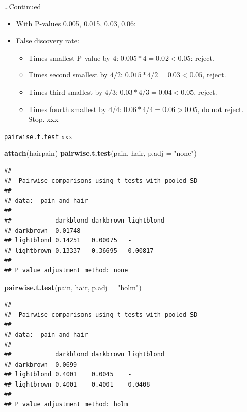 \documentclass[ignorenonframetext,]{beamer}
\newenvironment{Shaded}{\begin{snugshade}}{\end{snugshade}}
\newcommand{\DataTypeTok}[1]{\textcolor[rgb]{0.13,0.29,0.53}{#1}}
\newcommand{\KeywordTok}[1]{\textcolor[rgb]{0.13,0.29,0.53}{\textbf{#1}}}
\newcommand{\NormalTok}[1]{#1}
\newcommand{\StringTok}[1]{\textcolor[rgb]{0.31,0.60,0.02}{#1}}
\begin{document}
\begin{frame}{\ldots Continued}
\protect\hypertarget{continued}{}

\begin{itemize}
\item
  With P-values 0.005, 0.015, 0.03, 0.06:
\item
  False discovery rate:

  \begin{itemize}
  \item
    Times smallest P-value by 4: \(0.005*4=0.02<0.05\): reject.
  \item
    Times second smallest by \(4/2\): \(0.015*4/2=0.03<0.05\), reject.
  \item
    Times third smallest by \(4/3\): \(0.03*4/3=0.04<0.05\), reject.
  \item
    Times fourth smallest by \(4/4\): \(0.06*4/4=0.06>0.05\), do not
    reject. Stop. xxx
  \end{itemize}
\end{itemize}

\end{frame}

\begin{frame}[fragile]{\texttt{pairwise.t.test} xxx}
\protect\hypertarget{pairwise.t.test-xxx}{}

\tiny

\begin{Shaded}
\begin{Highlighting}[]
\KeywordTok{attach}\NormalTok{(hairpain)}
\KeywordTok{pairwise.t.test}\NormalTok{(pain, hair, }\DataTypeTok{p.adj =} \StringTok{"none"}\NormalTok{)}
\end{Highlighting}
\end{Shaded}

\begin{verbatim}
## 
##  Pairwise comparisons using t tests with pooled SD 
## 
## data:  pain and hair 
## 
##            darkblond darkbrown lightblond
## darkbrown  0.01748   -         -         
## lightblond 0.14251   0.00075   -         
## lightbrown 0.13337   0.36695   0.00817   
## 
## P value adjustment method: none
\end{verbatim}

\begin{Shaded}
\begin{Highlighting}[]
\KeywordTok{pairwise.t.test}\NormalTok{(pain, hair, }\DataTypeTok{p.adj =} \StringTok{"holm"}\NormalTok{)}
\end{Highlighting}
\end{Shaded}

\begin{verbatim}
## 
##  Pairwise comparisons using t tests with pooled SD 
## 
## data:  pain and hair 
## 
##            darkblond darkbrown lightblond
## darkbrown  0.0699    -         -         
## lightblond 0.4001    0.0045    -         
## lightbrown 0.4001    0.4001    0.0408    
## 
## P value adjustment method: holm
\end{verbatim}

\normalsize

\end{frame}
\end{document}
